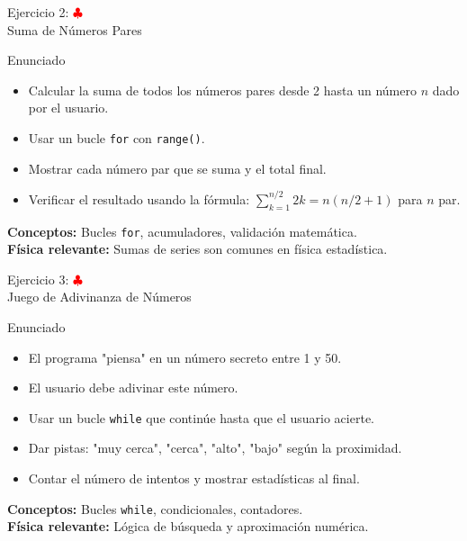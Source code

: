 \documentclass[10pt]{beamer}
\begin{document}
\begin{frame}{Ejercicio 2: \hfill \textcolor{red}{$\clubsuit$} \\ Suma de Números Pares}
  \begin{block}{Enunciado}
    \begin{itemize}
      \item Calcular la suma de todos los números pares desde 2 hasta un número \(n\) dado por el usuario.
      \item Usar un bucle \texttt{for} con \texttt{range()}.
      \item Mostrar cada número par que se suma y el total final.
      \item Verificar el resultado usando la fórmula: $\sum_{k=1}^{n/2} 2k = n(n/2 + 1)$ para \(n\) par.
    \end{itemize}
  \end{block}
  
  \textbf{Conceptos:} Bucles \texttt{for}, acumuladores, validación matemática.
  \\
  \textbf{Física relevante:} Sumas de series son comunes en física estadística.
\end{frame}

\begin{frame}{Ejercicio 3: \hfill \textcolor{red}{$\clubsuit$} \\ Juego de Adivinanza de Números}
  \begin{block}{Enunciado}
    \begin{itemize}
      \item El programa "piensa" en un número secreto entre 1 y 50.
      \item El usuario debe adivinar este número.
      \item Usar un bucle \texttt{while} que continúe hasta que el usuario acierte.
      \item Dar pistas: "muy cerca", "cerca", "alto", "bajo" según la proximidad.
      \item Contar el número de intentos y mostrar estadísticas al final.
    \end{itemize}
  \end{block}
  
  \textbf{Conceptos:} Bucles \texttt{while}, condicionales, contadores.
  \\
  \textbf{Física relevante:} Lógica de búsqueda y aproximación numérica.
\end{frame}
\end{document}
